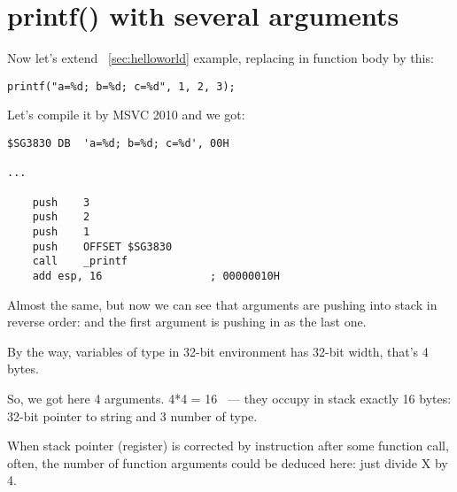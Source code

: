 ﻿\section{
{printf() with several arguments}}

{Now let's extend ~\ref{sec:helloworld} example, replacing \printf in 
\main function body by this:}

\begin{lstlisting}
printf("a=%d; b=%d; c=%d", 1, 2, 3);
\end{lstlisting}

{Let's compile it by MSVC 2010 and we got:}

\begin{lstlisting}
$SG3830	DB	'a=%d; b=%d; c=%d', 00H

...

	push	3
	push	2
	push	1
	push	OFFSET $SG3830
	call	_printf
	add	esp, 16					; 00000010H
\end{lstlisting}

{Almost the same, but now we can see that \printf arguments are pushing into stack in reverse order: and the first argument is pushing in as the last one.}

{By the way, variables of \Tint type in 32-bit environment has 32-bit width, that's 4 bytes.}

{So, we got here 4 arguments. 4*4 = 16 ~--- they occupy in stack exactly 16 bytes: 32-bit pointer to string and 3 number of \Tint type.}

{When stack pointer (\ESP register) is corrected by  instruction after some function 
call, often, the number of function arguments could be deduced here: just divide X by 4.}

